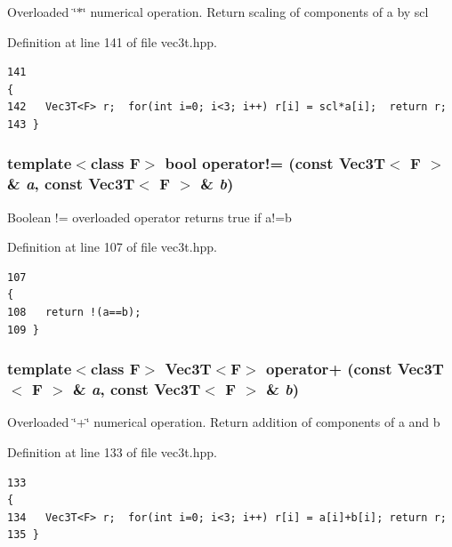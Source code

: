 Overloaded \char`\"{}$\ast$\char`\"{} numerical operation. Return scaling of components of a by scl 

Definition at line 141 of file vec3t.hpp.

\footnotesize\begin{verbatim}141                                                                         {
142   Vec3T<F> r;  for(int i=0; i<3; i++) r[i] = scl*a[i];  return r;
143 }
\end{verbatim}\normalsize 


\subsubsection{\setlength{\rightskip}{0pt plus 5cm}template$<$class F$>$ bool operator!= (const {\bf Vec3T}$<$ F $>$ \& {\em a}, const {\bf Vec3T}$<$ F $>$ \& {\em b})\hspace{0.3cm}{\tt  [inline]}}\label{vec3t_8hpp_8f66f71350f1f132ccf6543670f32e5f_8f66f71350f1f132ccf6543670f32e5f}


Boolean != overloaded operator returns true if a!=b 

Definition at line 107 of file vec3t.hpp.

\footnotesize\begin{verbatim}107                                                                                 {
108   return !(a==b);
109 }
\end{verbatim}\normalsize 


\subsubsection{\setlength{\rightskip}{0pt plus 5cm}template$<$class F$>$ {\bf Vec3T}$<$F$>$ operator+ (const {\bf Vec3T}$<$ F $>$ \& {\em a}, const {\bf Vec3T}$<$ F $>$ \& {\em b})\hspace{0.3cm}{\tt  [inline]}}\label{vec3t_8hpp_6bf8bf0f45f90a8197236ac5ee126b09_6bf8bf0f45f90a8197236ac5ee126b09}


Overloaded \char`\"{}+\char`\"{} numerical operation. Return addition of components of a and b 

Definition at line 133 of file vec3t.hpp.

\footnotesize\begin{verbatim}133                                                                                     {
134   Vec3T<F> r;  for(int i=0; i<3; i++) r[i] = a[i]+b[i]; return r; 
135 }
\end{verbatim}\normalsize 


